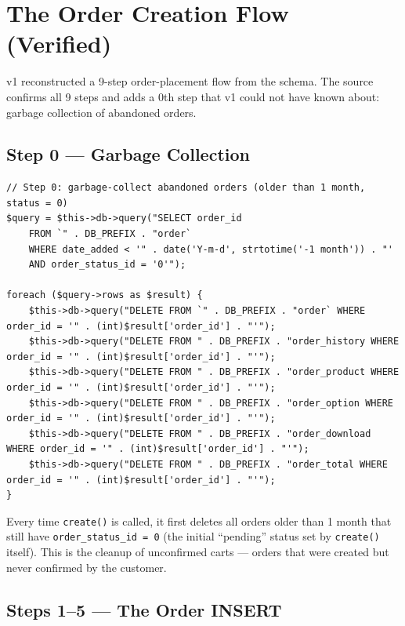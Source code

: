 \documentclass[11pt,a4paper]{article}
\begin{document}
\section{The Order Creation Flow (Verified)}\label{sec:order-flow}

v1 reconstructed a 9-step order-placement flow from the schema. The
source confirms all 9 steps and adds a 0th step that v1 could not
have known about: garbage collection of abandoned orders.

\subsection{Step 0 --- Garbage Collection}

\begin{lstlisting}[caption={\texttt{app/shop/model/checkout/order.php::create()} --- the garbage-collection step.},label={lst:order-gc}]
// Step 0: garbage-collect abandoned orders (older than 1 month, status = 0)
$query = $this->db->query("SELECT order_id
    FROM `" . DB_PREFIX . "order`
    WHERE date_added < '" . date('Y-m-d', strtotime('-1 month')) . "'
    AND order_status_id = '0'");

foreach ($query->rows as $result) {
    $this->db->query("DELETE FROM `" . DB_PREFIX . "order` WHERE order_id = '" . (int)$result['order_id'] . "'");
    $this->db->query("DELETE FROM " . DB_PREFIX . "order_history WHERE order_id = '" . (int)$result['order_id'] . "'");
    $this->db->query("DELETE FROM " . DB_PREFIX . "order_product WHERE order_id = '" . (int)$result['order_id'] . "'");
    $this->db->query("DELETE FROM " . DB_PREFIX . "order_option WHERE order_id = '" . (int)$result['order_id'] . "'");
    $this->db->query("DELETE FROM " . DB_PREFIX . "order_download WHERE order_id = '" . (int)$result['order_id'] . "'");
    $this->db->query("DELETE FROM " . DB_PREFIX . "order_total WHERE order_id = '" . (int)$result['order_id'] . "'");
}
\end{lstlisting}

Every time \texttt{create()} is called, it first deletes all orders
older than 1 month that still have \texttt{order\_status\_id = 0}
(the initial ``pending'' status set by \texttt{create()} itself).
This is the cleanup of unconfirmed carts --- orders that were
created but never confirmed by the customer.

\subsection{Steps 1--5 --- The Order INSERT}
\end{document}
